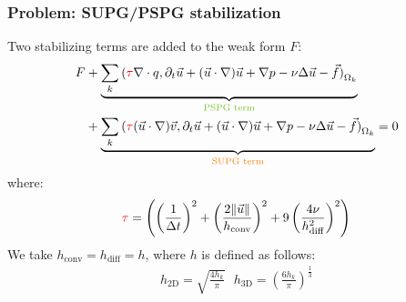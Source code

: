 \begin{frame}
	\frametitle{\textbf{Problem: SUPG/PSPG stabilization}}
	Two stabilizing terms are added to the weak form $F$:
	\begin{align*}
		F &+ \underbrace{\sum_{k} {(\textcolor{red}{\tau} \nabla \cdot q, \partial_t \vec{u} + (\vec{u} \cdot \nabla) \vec{u} + \nabla p - \nu \Delta \vec{u} - \vec{f})}_{\Omega_k}}_{\text{\textcolor{mygreen}{PSPG term}}} \\
		&+ \underbrace{\sum_{k} {(\textcolor{red}{\tau}(\vec{u} \cdot \nabla) \vec{v}, \partial_t \vec{u} + (\vec{u} \cdot \nabla) \vec{u} + \nabla p - \nu \Delta \vec{u} - \vec{f})}_{\Omega_k}}_{\text{\textcolor{hcolor}{SUPG term}}}= 0
	\end{align*}
	where:
	\begin{align*}
		\textcolor{red}{\tau} = \left( \left( \frac{1}{\Delta t}\right)^2 + \left( \frac{2 \| \vec{u}\|}{h_{\text{conv}}} \right)^2 + 9 \left( \frac{4\nu}{h^2_{\text{diff}}} \right)^{2}\right)
	\end{align*}
	We take $h_{\text{conv}} = h_{\text{diff}} = h$, where $h$ is defined as follows:
	\begin{align*}
		h_{\text{2D}} = \sqrt{\frac{4 h_{k}}{\pi}} \ \ \ h_{\text{3D}} = \left( \frac{6 h_{k}}{\pi} \right)^{\frac{1}{3}}
	\end{align*}
%	
	
\end{frame}
	
\begin{frame}
 \end{frame}